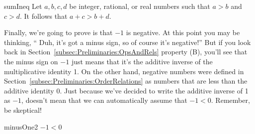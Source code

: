 \begin{prop}{sumIneq}
Let $a,b,c,d$ be integer, rational, or real numbers such that $a>b$ and $c>d$.  It follows that  $a+c > b+d$.
\end{prop}

%
%


Finally, we're going to prove is that $-1$ is negative.  At this point you may be thinking, `` Duh,  it's got a minus sign, so of course it's negative!'' But if you look back in Section~\ref{subsec:Preliminaries:OpsAndRels} property (B), you'll see that the minus sign on $-1$ just means that it's the additive inverse of the multiplicative identity 1. On the other hand, negative numbers were defined in  Section~\ref{subsec:Preliminaries:OrderRelations} as numbers that are less than the additive identity 0.  Just because we've decided to write the additive inverse of 1 as $-1$, doesn't mean that we can automatically assume that $-1<0$.  Remember, be skeptical!

\begin{prop}{minusOne2}
$-1 < 0$
\end{prop}

